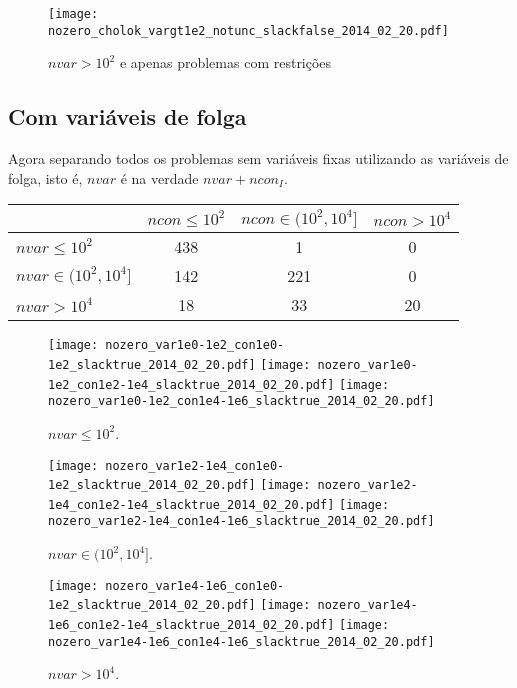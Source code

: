 \documentclass{article}
\begin{document}
\begin{figure}[H]
\centering
\texttt{[image: nozero\_cholok\_vargt1e2\_notunc\_slackfalse\_2014\_02\_20.pdf]}
\caption{ $nvar > 10^2$ e apenas problemas com restrições }
\label{fig:nvar_medium_and_big_not_unc}
\end{figure}

\newpage
\subsection{Com variáveis de folga}

Agora separando todos os problemas sem variáveis fixas utilizando as variáveis
de folga, isto é, $nvar$ é na verdade $nvar+ncon_I$.
\begin{center}
\begin{tabular}{|l|c|c|c|} \hline
& $ncon \leq 10^2$ & $ncon \in (10^2,10^4]$ & $ncon > 10^4$ \\ \hline
$nvar \leq 10^2$       & 438 &   1 &  0 \\ \hline
$nvar \in (10^2,10^4]$ & 142 & 221 &  0 \\ \hline
$nvar > 10^4$          &  18 &  33 & 20 \\ \hline
\end{tabular}
\end{center}

\begin{figure}[H]
\centering
\texttt{[image: nozero\_var1e0-1e2\_con1e0-1e2\_slacktrue\_2014\_02\_20.pdf]}
\texttt{[image: nozero\_var1e0-1e2\_con1e2-1e4\_slacktrue\_2014\_02\_20.pdf]}
\texttt{[image: nozero\_var1e0-1e2\_con1e4-1e6\_slacktrue\_2014\_02\_20.pdf]}
\caption{ $nvar \leq 10^2$. }
\label{fig:nvar_small}
\end{figure}
\begin{figure}[H]
\centering
\texttt{[image: nozero\_var1e2-1e4\_con1e0-1e2\_slacktrue\_2014\_02\_20.pdf]}
\texttt{[image: nozero\_var1e2-1e4\_con1e2-1e4\_slacktrue\_2014\_02\_20.pdf]}
\texttt{[image: nozero\_var1e2-1e4\_con1e4-1e6\_slacktrue\_2014\_02\_20.pdf]}
\caption{ $nvar \in (10^2,10^4]$. }
\label{fig:nvar_medium}
\end{figure}
\begin{figure}[H]
\centering
\texttt{[image: nozero\_var1e4-1e6\_con1e0-1e2\_slacktrue\_2014\_02\_20.pdf]}
\texttt{[image: nozero\_var1e4-1e6\_con1e2-1e4\_slacktrue\_2014\_02\_20.pdf]}
\texttt{[image: nozero\_var1e4-1e6\_con1e4-1e6\_slacktrue\_2014\_02\_20.pdf]}
\caption{ $nvar > 10^4$. }
\label{fig:nvar_big}
\end{figure}
\end{document}
